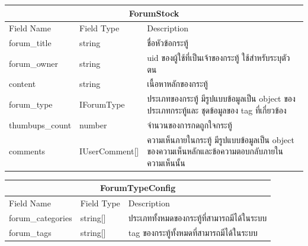 \begin{table}[H]
  \begin{tabular*}{\textwidth}{l|l|p{}}
  \hline
    \multicolumn{3}{c}{ForumStock}  \\ \hline                                                                                                     
    Field Name      & Field Type         & Description                                                                             \\\hline
    forum\_title    & string             & ชื่อหัวข้อกระทู้                                                                                \\
    forum\_owner    & string             & uid ของผู้ใช้ที่เป็นเจ้าของกระทู้ ใช้สำหรับระบุตัวตน                                            \\
    content         & string             & เนื้อหาหลักของกระทู้                                                                            \\
    forum\_type     & IForumType         & ประเภทของกระทู้ มีรูปแบบข้อมูลเป็น object ของประเภทกระทู้และ ชุดข้อมูลของ tag ที่เกี่ยวข้อง     \\
    thumbups\_count & number             & จำนวนของการกดถูกใจกระทู้                                                                        \\
    comments        & IUserComment{[}{]} & ความเห็นภายในกระทู้ มีรูปแบบข้อมูลเป็น object ของความเห็นหลักและข้อความตอบกลับภายในความเห็นนั้น \\ \hline
  \end{tabular*}
\end{table}

\begin{table}[H]
  \begin{tabular*}{\textwidth}{l|l|p{}}
  \hline
    \multicolumn{3}{c}{ForumTypeConfig}                                           \\\hline  
    Field Name        & Field Type   & Description                                \\\hline  
    forum\_categories & string{[}{]} & ประเภททั้งหมดของกระทู้ที่สามารถมีได้ในระบบ \\
    forum\_tags       & string{[}{]} & tag ของกระทู้ทั้งหมดที่สามารถมีได้ในระบบ \\ \hline  
  \end{tabular*}
\end{table}

